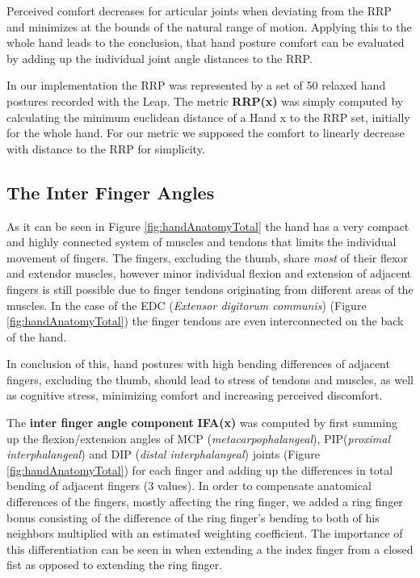 \documentclass{sig-alternate-05-2015}
\begin{document}
Perceived comfort decreases for articular joints when deviating from the RRP and minimizes at the bounds of the natural range of motion. Applying this to the whole hand leads to the conclusion, that hand posture comfort can be evaluated by adding up the individual joint angle distances to the RRP. \cite{naddeo2015proposal}

In our implementation the RRP was represented by a set of 50 relaxed hand postures recorded with the Leap. The metric \textbf{RRP(x)} was simply computed by calculating the minimum euclidean distance of a Hand x to the RRP set, initially for the whole hand. 
For our metric we supposed the comfort to linearly decrease with distance to the RRP for simplicity.

\subsection{The Inter Finger Angles}

As it can be seen in Figure \ref{fig:handAnatomyTotal}
the hand has a very compact and highly connected system of muscles and tendons that limits the individual movement of fingers.
The fingers, excluding the thumb, share \textsl{most} of their flexor and extendor muscles, however minor individual flexion and extension of adjacent fingers is still possible due to finger tendons originating from different areas of the muscles. In the case of the EDC (\textit{Extensor digitorum communis}) (Figure \ref{fig:handAnatomyTotal}) the finger tendons are even interconnected on the back of the hand. 

In conclusion of this, hand postures with high bending differences of adjacent fingers, excluding the thumb, should lead to stress of tendons and muscles, as well as cognitive stress, minimizing comfort and increasing perceived discomfort.

The \textbf{inter finger angle component} \textbf{IFA(x)} was computed by first summing up the flexion/extension angles of MCP (\textit{metacarpophalangeal}), PIP(\textit{proximal interphalangeal}) and DIP (\textit{distal interphalangeal}) joints (Figure \ref{fig:handAnatomyTotal}) for each finger and adding up the differences in total bending of adjacent fingers (3 values). In order to compensate anatomical differences of the fingers, mostly affecting the ring finger, we added a ring finger bonus consisting of the difference of the ring finger's bending to both of his neighbors multiplied with an estimated weighting coefficient. The importance of this differentiation can be seen in when extending a the index finger from a closed fist as opposed to extending the ring finger. 
\end{document}

